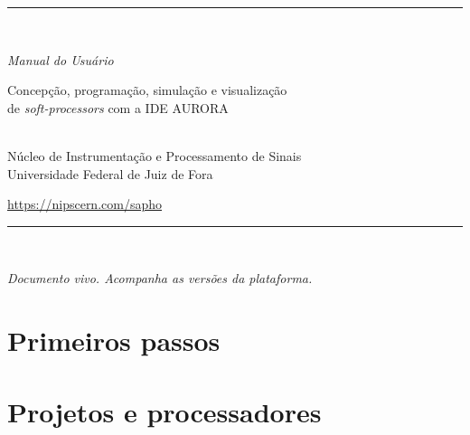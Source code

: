\documentclass[11pt,a4paper,twoside,openright]{book}
\begin{document}
\frontmatter

\begin{titlepage}
\centering
\vspace*{2.8cm}
{\color{regua}\rule{0.35\linewidth}{0.8pt}}\\[26pt]
{\fontsize{58}{58}\selectfont{}\par}
\vspace{16pt}
{\Large\color{ink}\textit{Manual do Usuário}\par}
\vspace{34pt}
{\normalsize\color{cinza} Concepção, programação, simulação e visualização\\ de \textit{soft-processors} com a IDE AURORA\par}
\vfill
{\small{}\\[4pt]
\small\color{cinza} Núcleo de Instrumentação e Processamento de Sinais\\
Universidade Federal de Juiz de Fora\par}
\vspace{18pt}
{\small\color{cinza}\url{https://nipscern.com/sapho}\par}
\vspace{26pt}
{\color{regua}\rule{0.35\linewidth}{0.8pt}}\\[14pt]
{\footnotesize\color{cinza}\textit{Documento vivo. Acompanha as versões da plataforma.}\par}
\vspace*{1.6cm}
\end{titlepage}

\tableofcontents



\mainmatter

\part{Primeiros passos}




\part{Projetos e processadores}



\end{document}
